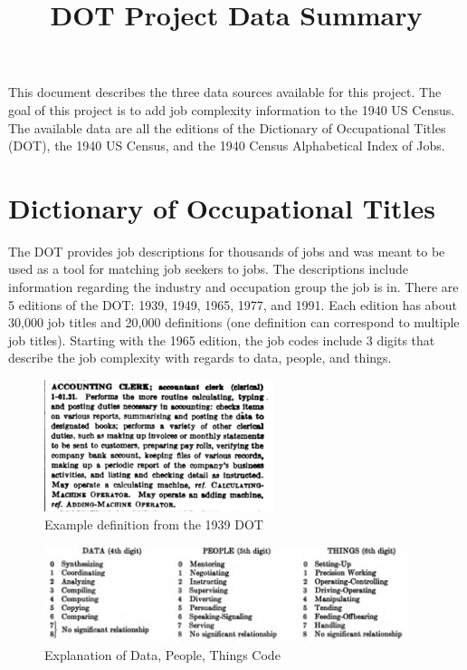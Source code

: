 \documentclass[11pt]{article}
\title{DOT Project Data Summary}
\begin{document}
\maketitle

This document describes the three data sources available for this project. The goal of this
project is to add job complexity information to the 1940 US Census. The available data are
all the editions of the Dictionary of Occupational Titles (DOT), the 1940 US Census, and
the 1940 Census Alphabetical Index of Jobs.

\section{Dictionary of Occupational Titles}

The DOT provides job descriptions for thousands of jobs and was meant to be used as a tool for matching job seekers to jobs. The descriptions include information regarding the industry and occupation group the job is in. There are 5 editions of the DOT: 1939, 1949, 1965, 1977, and 1991. Each edition has about 30,000 job titles and 20,000 definitions (one definition can correspond to multiple job titles). Starting with the 1965 edition, the job codes include 3 digits that describe the job complexity with regards to data, people, and things.

\begin{figure}[h]
    \centering
    \caption{Example definition from the 1939 DOT}
    \includegraphics[width=0.6\textwidth, keepaspectratio=true]{dot_def}
\end{figure}

\begin{figure}[h]
        \centering
        \caption{Explanation of Data, People, Things Code}
        \includegraphics[width=0.95\textwidth, keepaspectratio=true]{DPT}
\end{figure}
\end{document}
